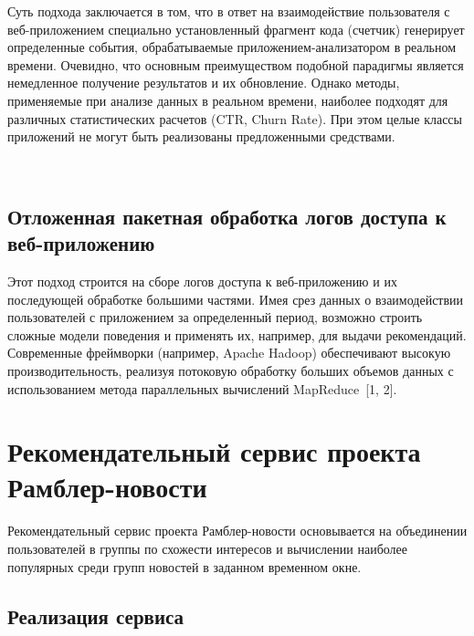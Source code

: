 \begin{multicols}{2}
   Суть подхода заключается в том, что в ответ на взаимодействие пользователя 
с веб-при\-ло\-же\-ни\-ем специально установленный фрагмент кода (счетчик) 
генерирует определенные события, обрабатываемые при\-ло\-же\-ни\-ем-ана\-ли\-за\-то\-ром 
в реальном времени. Очевидно, что основным преимуществом 
подобной парадигмы является немедленное получение результатов и их 
обновление. Однако методы, применяемые при анализе данных в реальном 
времени, наиболее подходят для различных статистических расчетов (CTR, 
Churn Rate). При этом целые классы приложений не могут быть реализованы 
предложенными средствами.

\begin{figure*}[b] %
\vspace*{1pt}
\begin{center}
 \mbox{%
 \epsfxsize=133.566mm
 }
 \end{center}
 \vspace*{-6pt}
\end{figure*}
   
\subsection{Отложенная пакетная обработка логов доступа к веб-приложению}

   Этот подход строится на сборе логов доступа к веб-при\-ло\-же\-нию и их 
последующей обработке большими частями. Имея срез данных о 
взаимодействии пользователей с приложением за определенный период, 
возможно строить сложные модели поведения и применять их, например, для 
выдачи рекомендаций. Современные фреймворки (например, Apache Hadoop) 
обеспечивают высокую производительность, реализуя потоковую обработку 
больших объемов данных с использованием метода параллельных вычислений 
MapReduce~[1, 2].

\section{Рекомендательный сервис проекта Рамблер-новости}

   Рекомендательный сервис проекта Рамблер-но\-вости основывается на 
объединении пользователей в группы по схожести интересов и вычислении 
наиболее популярных среди групп новостей в заданном временном окне.

\subsection{Реализация сервиса}


\end{multicols}
